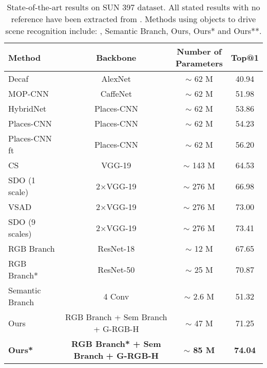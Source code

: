 \documentclass[review, 3p, sort&compress]{elsarticle}
\begin{document}
\begin{table}[t!]
    \begin{centering}
    \renewcommand{\arraystretch}{1.2}
    \footnotesize
    \begin{tabular}{lccc}
        \hline 
        Method & Backbone & \makecell{Number of \\ Parameters} & Top@1\tabularnewline 
        \hline 
        Decaf & AlexNet & $\mathtt{\sim}$ 62 M & 40.94\tabularnewline
        MOP-CNN  & CaffeNet & $\mathtt{\sim}$ 62 M & 51.98\tabularnewline
        HybridNet & Places-CNN & $\mathtt{\sim}$ 62 M & 53.86\tabularnewline
        Places-CNN & Places-CNN & $\mathtt{\sim}$ 62 M & 54.23\tabularnewline
        Places-CNN ft & Places-CNN & $\mathtt{\sim}$ 62 M & 56.20\tabularnewline
        CS & VGG-19 & $\mathtt{\sim}$ 143 M & 64.53\tabularnewline
        SDO (1 scale) \cite{cheng2018scene} & 2\(\times\)VGG-19 & $\mathtt{\sim}$ 276 M & 66.98\tabularnewline
        VSAD \cite{wang2017weakly} & 2\(\times\)VGG-19 & $\mathtt{\sim}$ 276 M & 73.00\tabularnewline
        SDO (9 scales) \cite{cheng2018scene} & 2\(\times\)VGG-19 & $\mathtt{\sim}$ 276 M & 73.41\tabularnewline
        \hline
        RGB Branch & ResNet-18 & $\mathtt{\sim}$ 12 M & 67.65\tabularnewline
        RGB Branch* & ResNet-50 & $\mathtt{\sim}$ 25 M & 70.87\tabularnewline
        Semantic Branch & 4 Conv & $\mathtt{\sim}$ 2.6 M & 51.32\tabularnewline
        Ours &  RGB Branch + Sem Branch + G-RGB-H & $\mathtt{\sim}$ 47 M & 71.25\tabularnewline
        \textbf{Ours*} & \textbf{RGB Branch* + Sem Branch} \textbf{+ G-RGB-H} & \textbf{$\mathtt{\sim}$ 85 M} & \textbf{74.04}\tabularnewline
        \hline 
    \end{tabular}
    \caption{State-of-the-art results on SUN 397 dataset. All stated results with no reference have been extracted from \cite{cheng2018scene}. Methods using objects to drive scene recognition include: \cite{cheng2018scene, wang2017weakly}, Semantic Branch, Ours, Ours* and Ours**.}
    \label{tab:SUN 397 Results}
    \par\end{centering}
\end{table}
\end{document}
